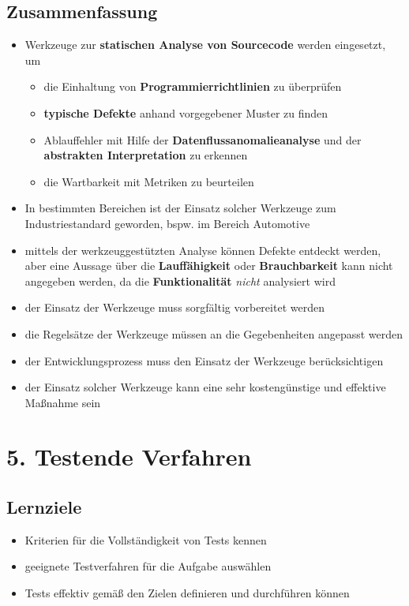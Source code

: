 \subsection*{Zusammenfassung}
\begin{itemize}
    \item Werkzeuge zur \textbf{statischen Analyse von Sourcecode} werden eingesetzt, um
    \begin{itemize}
        \item die Einhaltung von \textbf{Programmierrichtlinien} zu überprüfen
        \item \textbf{typische Defekte} anhand vorgegebener Muster zu finden
        \item Ablauffehler mit Hilfe der \textbf{Datenflussanomalieanalyse} und der \textbf{abstrakten Interpretation} zu erkennen
        \item die Wartbarkeit mit Metriken zu beurteilen
    \end{itemize}
    \item In bestimmten Bereichen ist der Einsatz solcher Werkzeuge zum Industriestandard geworden, bspw. im Bereich Automotive
    \item mittels der werkzeuggestützten Analyse können Defekte entdeckt werden, aber eine Aussage über die \textbf{Lauffähigkeit} oder \textbf{Brauchbarkeit} kann nicht angegeben werden, da die \textbf{Funktionalität} \textit{nicht} analysiert wird
    \item der Einsatz der Werkzeuge muss sorgfältig vorbereitet werden
    \item die Regelsätze der Werkzeuge müssen an die Gegebenheiten angepasst werden
    \item der Entwicklungsprozess muss den Einsatz der Werkzeuge berücksichtigen
    \item der Einsatz solcher Werkzeuge kann eine sehr kostengünstige und effektive Maßnahme sein
\end{itemize}

\section*{5. Testende Verfahren}
\subsection*{Lernziele}
\begin{itemize}
    \item Kriterien für die Vollständigkeit von Tests kennen
    \item geeignete Testverfahren für die Aufgabe auswählen
    \item Tests effektiv gemäß den Zielen definieren und durchführen können
\end{itemize}


